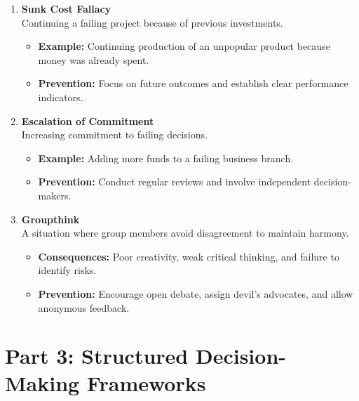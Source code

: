 \documentclass[12pt,a4paper]{article}
\begin{document}
\begin{enumerate}
    \item \textbf{Sunk Cost Fallacy} \\
    Continuing a failing project because of previous investments.
    \begin{itemize}
        \item \textbf{Example:} Continuing production of an unpopular product because money was already spent.
        \item \textbf{Prevention:} Focus on future outcomes and establish clear performance indicators.
    \end{itemize}

    \item \textbf{Escalation of Commitment} \\
    Increasing commitment to failing decisions.
    \begin{itemize}
        \item \textbf{Example:} Adding more funds to a failing business branch.
        \item \textbf{Prevention:} Conduct regular reviews and involve independent decision-makers.
    \end{itemize}

    \item \textbf{Groupthink} \\
    A situation where group members avoid disagreement to maintain harmony.
    \begin{itemize}
        \item \textbf{Consequences:} Poor creativity, weak critical thinking, and failure to identify risks.
        \item \textbf{Prevention:} Encourage open debate, assign devil’s advocates, and allow anonymous feedback.
    \end{itemize}
\end{enumerate}

\section*{Part 3: Structured Decision-Making Frameworks}
\end{document}
